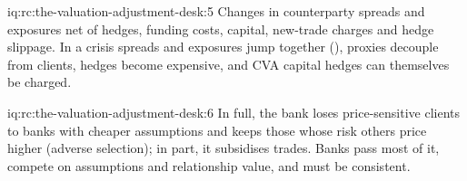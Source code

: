 \begin{solution}{iq:rc:the-valuation-adjustment-desk:5}
Changes in counterparty spreads and exposures net of hedges, funding costs, capital, new-trade
charges and hedge slippage. In a crisis spreads and exposures jump together (),
proxies decouple from clients, hedges become expensive, and CVA capital hedges can themselves
be charged.
\end{solution}

\begin{solution}{iq:rc:the-valuation-adjustment-desk:6}
In full, the bank loses price-sensitive clients to banks with cheaper assumptions and keeps
those whose risk others price higher (adverse selection); in part, it subsidises trades. Banks
pass most of it, compete on assumptions and relationship value, and must be consistent.
\end{solution}
